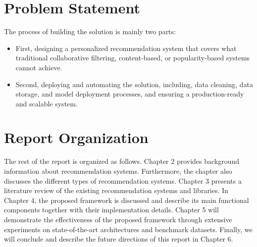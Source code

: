 \section{Problem Statement}

The process of building the solution is mainly two parts:

\begin{itemize}
    \item First, designing a personalized recommendation system that covers what traditional collaborative filtering, content-based, or popularity-based systems cannot achieve.
    \item Second, deploying and automating the solution, including, data cleaning, data storage, and model deployment processes, and ensuring a production-ready and scalable system.
\end{itemize}
\section{Report Organization}
The rest of the report is organized as follows. Chapter 2 provides background information about recommendation systems. Furthermore, the chapter also discusses the different types of recommendation systems. Chapter 3 presents a literature review of the existing recommendation systems and libraries. In Chapter 4, the proposed framework is discussed and describe its main functional components together with their implementation details. Chapter 5 will demonstrate the effectiveness of the proposed framework through extensive experiments on state-of-the-art architectures and benchmark datasets. Finally, we will conclude and describe the future directions of this report in Chapter 6.
